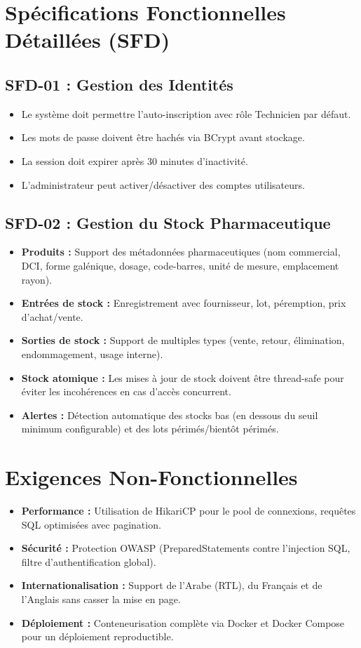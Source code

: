 \documentclass[12pt, a4paper]{report}
\begin{document}
\section{Spécifications Fonctionnelles Détaillées (SFD)}

\subsection{SFD-01 : Gestion des Identités}
\begin{itemize}
    \item Le système doit permettre l'auto-inscription avec rôle Technicien par défaut.
    \item Les mots de passe doivent être hachés via BCrypt avant stockage.
    \item La session doit expirer après 30 minutes d'inactivité.
    \item L'administrateur peut activer/désactiver des comptes utilisateurs.
\end{itemize}

\subsection{SFD-02 : Gestion du Stock Pharmaceutique}
\begin{itemize}
    \item \textbf{Produits :} Support des métadonnées pharmaceutiques (nom commercial, DCI, forme galénique, dosage, code-barres, unité de mesure, emplacement rayon).
    \item \textbf{Entrées de stock :} Enregistrement avec fournisseur, lot, péremption, prix d'achat/vente.
    \item \textbf{Sorties de stock :} Support de multiples types (vente, retour, élimination, endommagement, usage interne).
    \item \textbf{Stock atomique :} Les mises à jour de stock doivent être thread-safe pour éviter les incohérences en cas d'accès concurrent.
    \item \textbf{Alertes :} Détection automatique des stocks bas (en dessous du seuil minimum configurable) et des lots périmés/bientôt périmés.
\end{itemize}

\section{Exigences Non-Fonctionnelles}
\begin{itemize}
    \item \textbf{Performance :} Utilisation de HikariCP pour le pool de connexions, requêtes SQL optimisées avec pagination.
    \item \textbf{Sécurité :} Protection OWASP (PreparedStatements contre l'injection SQL, filtre d'authentification global).
    \item \textbf{Internationalisation :} Support de l'Arabe (RTL), du Français et de l'Anglais sans casser la mise en page.
    \item \textbf{Déploiement :} Conteneurisation complète via Docker et Docker Compose pour un déploiement reproductible.
\end{itemize}
\end{document}
